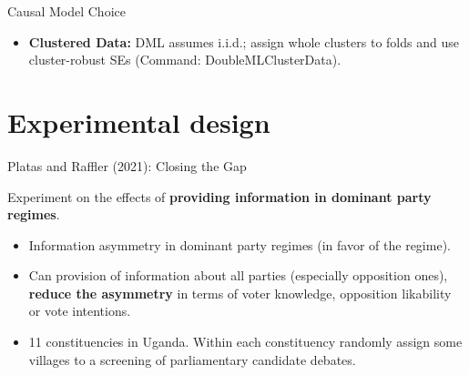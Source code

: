 \documentclass[10pt,table,aspectratio=169]{beamer}
\begin{document}
\begin{frame}[plain, label = two_dimensions]{Causal Model Choice}
\centering
{}
\pause
\begin{itemize}
  \item \alert{\bf Clustered Data:} DML assumes i.i.d.; assign whole clusters to folds and use cluster-robust SEs (Command: DoubleMLClusterData). 

\end{itemize}
\end{frame}

\section{Experimental design}

\begin{frame}[plain, label = two_dimensions]{Platas and Raffler (2021): Closing the Gap}

Experiment on the effects of \alert{\bf providing information in dominant party regimes}. 
\begin{itemize}
  \item Information asymmetry in dominant party regimes (in favor of the regime). 
  \item Can provision of information about all parties (especially opposition ones), \alert{\bf reduce the asymmetry} in terms of voter knowledge, opposition likability or vote intentions. 
  \item  11 constituencies in Uganda. Within each constituency randomly assign some villages to a screening of parliamentary candidate debates. 
\end{itemize}

\end{frame}
\end{document}
